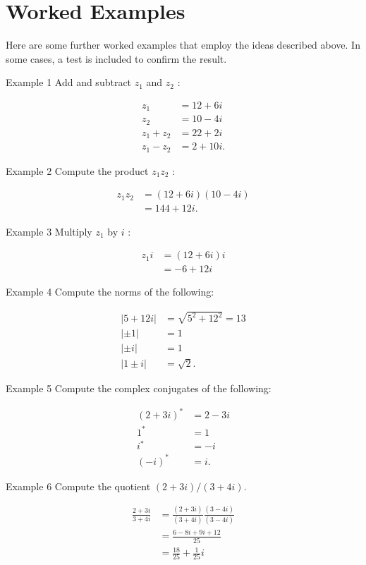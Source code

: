 \section{Worked Examples}
Here are some further worked examples that employ the ideas described above. In some cases, a test is included to confirm the result.

Example 1 Add and subtract $z_{1}$ and $z_{2}$ :

$$
\begin{aligned}
z_{1} & =12+6 i \\
z_{2} & =10-4 i \\
z_{1}+z_{2} & =22+2 i \\
z_{1}-z_{2} & =2+10 i .
\end{aligned}
$$

Example 2 Compute the product $z_{1} z_{2}$ :

$$
\begin{aligned}
z_{1} z_{2} & =(12+6 i)(10-4 i) \\
& =144+12 i .
\end{aligned}
$$

Example 3 Multiply $z_{1}$ by $i$ :

$$
\begin{aligned}
z_{1} i & =(12+6 i) i \\
& =-6+12 i
\end{aligned}
$$

Example 4 Compute the norms of the following:

$$
\begin{aligned}
|5+12 i| & =\sqrt{5^{2}+12^{2}}=13 \\
|\pm 1| & =1 \\
|\pm i| & =1 \\
|1 \pm i| & =\sqrt{2} .
\end{aligned}
$$

Example 5 Compute the complex conjugates of the following:

$$
\begin{aligned}
(2+3 i)^{*} & =2-3 i \\
1^{*} & =1 \\
i^{*} & =-i \\
(-i)^{*} & =i .
\end{aligned}
$$

Example 6 Compute the quotient $(2+3 i) /(3+4 i)$.

$$
\begin{aligned}
\frac{2+3 i}{3+4 i} & =\frac{(2+3 i)}{(3+4 i)} \frac{(3-4 i)}{(3-4 i)} \\
& =\frac{6-8 i+9 i+12}{25} \\
& =\frac{18}{25}+\frac{1}{25} i
\end{aligned}
$$

